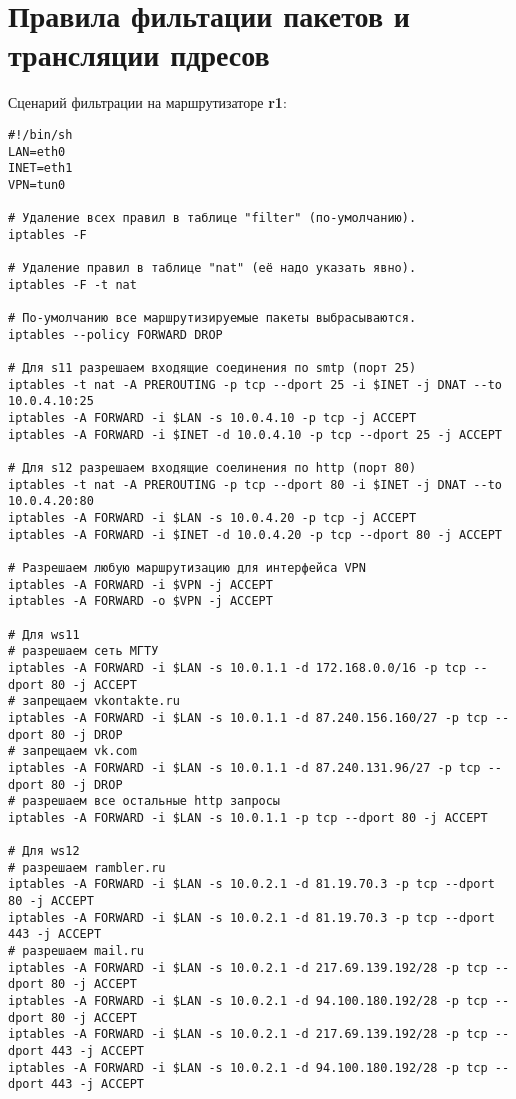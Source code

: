 \documentclass[a4paper,12pt]{article}
\begin{document}
\section{Правила фильтации пакетов и трансляции пдресов}

Сценарий фильтрации на маршрутизаторе \textbf{r1}:

\begin{Verbatim}
#!/bin/sh
LAN=eth0
INET=eth1
VPN=tun0

# Удаление всех правил в таблице "filter" (по-умолчанию).
iptables -F

# Удаление правил в таблице "nat" (её надо указать явно).
iptables -F -t nat

# По-умолчанию все маршрутизируемые пакеты выбрасываются.
iptables --policy FORWARD DROP

# Для s11 разрешаем входящие соединения по smtp (порт 25)
iptables -t nat -A PREROUTING -p tcp --dport 25 -i $INET -j DNAT --to 10.0.4.10:25
iptables -A FORWARD -i $LAN -s 10.0.4.10 -p tcp -j ACCEPT
iptables -A FORWARD -i $INET -d 10.0.4.10 -p tcp --dport 25 -j ACCEPT

# Для s12 разрешаем входящие соелинения по http (порт 80)
iptables -t nat -A PREROUTING -p tcp --dport 80 -i $INET -j DNAT --to 10.0.4.20:80
iptables -A FORWARD -i $LAN -s 10.0.4.20 -p tcp -j ACCEPT
iptables -A FORWARD -i $INET -d 10.0.4.20 -p tcp --dport 80 -j ACCEPT

# Разрешаем любую маршрутизацию для интерфейса VPN
iptables -A FORWARD -i $VPN -j ACCEPT
iptables -A FORWARD -o $VPN -j ACCEPT

# Для ws11
# разрешаем сеть МГТУ
iptables -A FORWARD -i $LAN -s 10.0.1.1 -d 172.168.0.0/16 -p tcp --dport 80 -j ACCEPT
# запрещаем vkontakte.ru
iptables -A FORWARD -i $LAN -s 10.0.1.1 -d 87.240.156.160/27 -p tcp --dport 80 -j DROP
# запрещаем vk.com
iptables -A FORWARD -i $LAN -s 10.0.1.1 -d 87.240.131.96/27 -p tcp --dport 80 -j DROP
# разрешаем все остальные http запросы
iptables -A FORWARD -i $LAN -s 10.0.1.1 -p tcp --dport 80 -j ACCEPT

# Для ws12
# разрешаем rambler.ru
iptables -A FORWARD -i $LAN -s 10.0.2.1 -d 81.19.70.3 -p tcp --dport 80 -j ACCEPT
iptables -A FORWARD -i $LAN -s 10.0.2.1 -d 81.19.70.3 -p tcp --dport 443 -j ACCEPT
# разрешаем mail.ru
iptables -A FORWARD -i $LAN -s 10.0.2.1 -d 217.69.139.192/28 -p tcp --dport 80 -j ACCEPT
iptables -A FORWARD -i $LAN -s 10.0.2.1 -d 94.100.180.192/28 -p tcp --dport 80 -j ACCEPT
iptables -A FORWARD -i $LAN -s 10.0.2.1 -d 217.69.139.192/28 -p tcp --dport 443 -j ACCEPT
iptables -A FORWARD -i $LAN -s 10.0.2.1 -d 94.100.180.192/28 -p tcp --dport 443 -j ACCEPT


\end{Verbatim}
\end{document}
